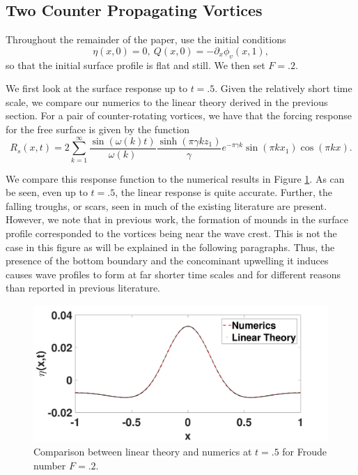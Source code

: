 \documentclass[a4paper,11pt]{article}
\newcommand{\p}{\partial}
\begin{document}
\subsection*{Two Counter Propagating Vortices}
Throughout the remainder of the paper, use the initial conditions
\[
\eta(x,0) = 0, ~ 	Q(x,0) = -\p_{x}\phi_{v}(x,1),
\]
so that the initial surface profile is flat and still.  We then set $F=.2$.  

We first look at the surface response up to $t=.5$.  Given the relatively short time scale, we compare our numerics to the linear theory derived in the previous section.  For a pair of counter-rotating vortices, we have that the forcing response for the free surface is given by the function
\[
R_{s}(x,t) = 2\sum_{k=1}^{\infty} \frac{\sin(\omega(k)t)}{\omega(k)}\frac{\sinh(\pi \gamma k z_{1})}{\gamma}e^{-\pi \gamma k}\sin(\pi k x_{1})\cos(\pi k x).
\]

We compare this response function to the numerical results in Figure \ref{fig:linrep}.  As can be seen, even up to $t=.5$, the linear response is quite accurate.  Further, the falling troughs, or scars, seen in much of the existing literature \cite{marcus,tryggvason} are present.  However, we note that in previous work, the formation of mounds in the surface profile corresponded to the vortices being near the wave crest.  This is not the case in this figure as will be explained in the following paragraphs.  Thus, the presence of the bottom boundary and the concominant upwelling it induces causes wave profiles to form at far shorter time scales and for different reasons than reported in previous literature.  
\begin{figure}[!h]
\centering
\includegraphics[width=.75\textwidth]{lin_response_tf_pt5}
\caption{Comparison between linear theory and numerics at $t=.5$ for Froude number $F=.2$.}
\label{fig:linrep}
\end{figure}
\end{document}
